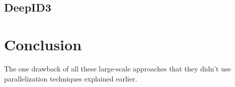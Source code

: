 \documentclass[paper=a4, fontsize=11pt]{scrartcl} %
\numberwithin{equation}{section} %
\numberwithin{figure}{section} %
\numberwithin{table}{section} %
\begin{document}
\subsection{DeepID3}

\newpage

\section{Conclusion}
The one drawback of all these large-scale approaches that they didn't use parallelization techniques explained earlier.

\newpage




\end{document}
